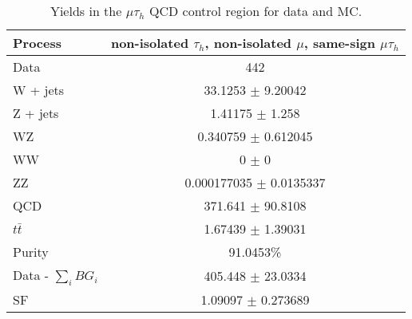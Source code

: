 \begin{table}[ht]
\begin{center}
 \caption{ Yields in the $\mu\tau_{h}$ QCD control region for data and MC.}
 \begin{tabular}{| l | c |}
 \hline\hline
Process & non-isolated $\tau_{h}$, non-isolated $\mu$, same-sign $\mu\tau_{h}$ \\ \hline
Data & 442 \\
W + jets & 33.1253 $\pm$ 9.20042 \\
Z + jets & 1.41175 $\pm$ 1.258 \\
WZ & 0.340759 $\pm$ 0.612045 \\
WW & 0 $\pm$ 0 \\
ZZ & 0.000177035 $\pm$ 0.0135337 \\
QCD & 371.641 $\pm$ 90.8108 \\
$t\bar{t}$ & 1.67439 $\pm$ 1.39031 \\ \hline
Purity & 91.0453\% \\
Data - $\sum\limits_{i} BG_{i}$ & 405.448 $\pm$ 23.0334 \\ \hline
SF & 1.09097 $\pm$ 0.273689 \\
 \hline
 \hline
 \end{tabular}
 \label{table:theQCDMuTauControlTable}
\end{center}
\end{table}

